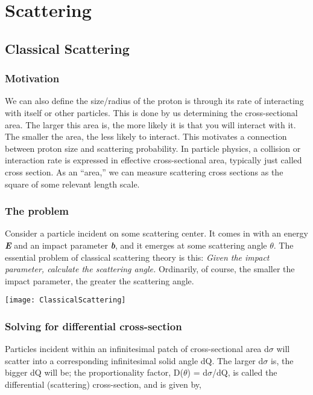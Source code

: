 \chapter{Scattering}
\section{Classical Scattering}
\subsection{Motivation}
We can also define the size/radius of the proton is through its rate of interacting with 	itself or other particles.
This is done by us determining the cross-sectional area. The larger this area is, the more likely it is that you will interact with it. The smaller the area, the less likely to interact.
This motivates a connection between proton size and scattering probability. In particle physics, a collision or interaction rate is expressed in effective cross-sectional area, typically just called cross section.
As an	“area,” we can measure scattering cross sections as the square of some relevant 	length scale.

\subsection{The problem}
Consider a particle incident on some scattering center. It comes in with an energy \textrm{\textit{\textbf{E}}} and an impact parameter \textrm{\textit{\textbf{b}}}, and it emerges at some scattering angle \textrm{\textit{$\theta$}}.
The essential problem of classical scattering theory is this: \textit{Given the impact parameter, calculate the scattering angle.} 
Ordinarily, of course, the smaller the impact parameter, the greater the scattering angle. 
\begin{center}
	\texttt{[image: ClassicalScattering]}
\end{center}
\newpage

\subsection{Solving for differential cross-section}
Particles incident within an infinitesimal patch of cross-sectional area d$\sigma$ will scatter into a corresponding infinitesimal solid angle dQ. 
The larger d$\sigma$ is, the bigger dQ will be; the proportionality factor, D($\theta$) = d$\sigma$/dQ, is called the differential (scattering) cross-section, and is given by,

